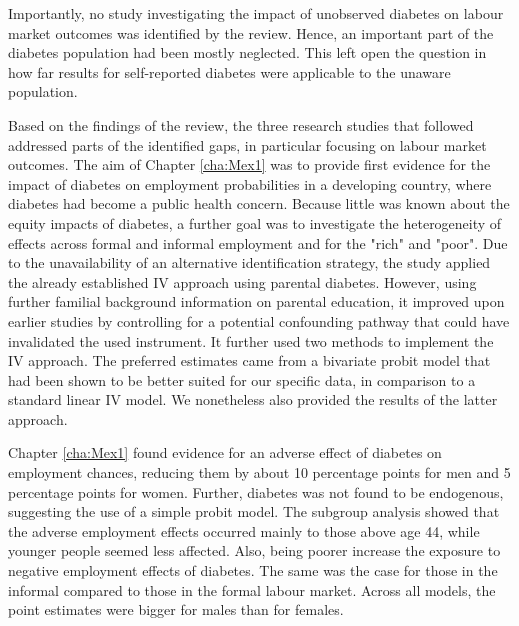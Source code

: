 Importantly, no study investigating the impact of unobserved diabetes on labour market outcomes was identified by the review. Hence, an important part of the diabetes population had been mostly neglected. This left open the question in how far results for self-reported diabetes were applicable to the unaware population.

Based on the findings of the review, the three research studies that followed addressed parts of the identified gaps, in particular focusing on labour market outcomes. The aim of Chapter \ref{cha:Mex1} was to provide first evidence for the impact of diabetes on employment probabilities in a developing country, where diabetes had become a public health concern. Because little was known about the equity impacts of diabetes, a further goal was to investigate the heterogeneity of effects across formal and informal employment and for the "rich" and "poor". Due to the unavailability of an alternative identification strategy, the study applied the already established \ac{IV} approach using parental diabetes. However, using further familial background information on parental education, it improved upon earlier studies by controlling for a potential confounding pathway that could have invalidated the used instrument. It further used two methods to implement the \ac{IV} approach. The preferred estimates came from a bivariate probit model that had been shown to be better suited for our specific data, in comparison to a standard linear \ac{IV} model. We nonetheless also provided the results of the latter approach.

Chapter \ref{cha:Mex1} found evidence for an adverse effect of diabetes on employment chances, reducing them by about 10 percentage points for men and 5 percentage points for women. Further, diabetes was not found to be endogenous, suggesting the use of a simple probit model. The subgroup analysis showed that the adverse employment effects occurred mainly to those above age 44, while younger people seemed less affected. Also, being poorer increase the exposure to negative employment effects of diabetes. The same was the case for those in the informal compared to those in the formal labour market. Across all models, the point estimates were bigger for males than for females. 

